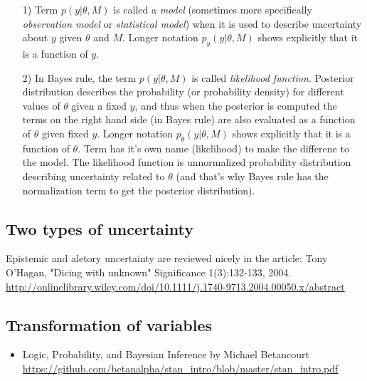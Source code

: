 \documentclass[a4paper,11pt,english]{article}
\begin{document}
\begin{itemize}
\item[1)] Term $p(y|\theta,M)$ is called a \emph{model} (sometimes
  more specifically \emph{observation model} or \emph{statistical
    model}) when it is used to describe uncertainty about $y$ given
  $\theta$ and $M$. Longer notation $p_y(y|\theta,M)$ shows explicitly
  that it is a function of $y$.

\item[2)] In Bayes rule, the term $p(y|\theta,M)$ is called
  \emph{likelihood function}. Posterior distribution describes the
  probability (or probability density) for different values of
  $\theta$ given a fixed $y$, and thus when the posterior is computed
  the terms on the right hand side (in Bayes rule) are also evaluated
  as a function of $\theta$ given fixed $y$. Longer notation
  $p_\theta(y|\theta,M)$ shows explicitly that it is a function of
  $\theta$. Term has it's own name (likelihood) to make the differene
  to the model. The likelihood function is unnormalized probability
  distribution describing uncertainty related to $\theta$ (and that's
  why Bayes rule has the normalization term to get the posterior
  distribution).
\end{itemize}

\subsection*{Two types of uncertainty}

Epistemic and aletory uncertainty are reviewed nicely in the article:
Tony O'Hagan, "Dicing with unknown"
Significance 1(3):132-133, 2004. \url{http://onlinelibrary.wiley.com/doi/10.1111/j.1740-9713.2004.00050.x/abstract}

\subsection*{Transformation of variables}

  \begin{itemize}
  \item Logic, Probability, and Bayesian Inference by Michael Betancourt
    \url{https://github.com/betanalpha/stan_intro/blob/master/stan_intro.pdf}
  \end{itemize}
\end{document}
